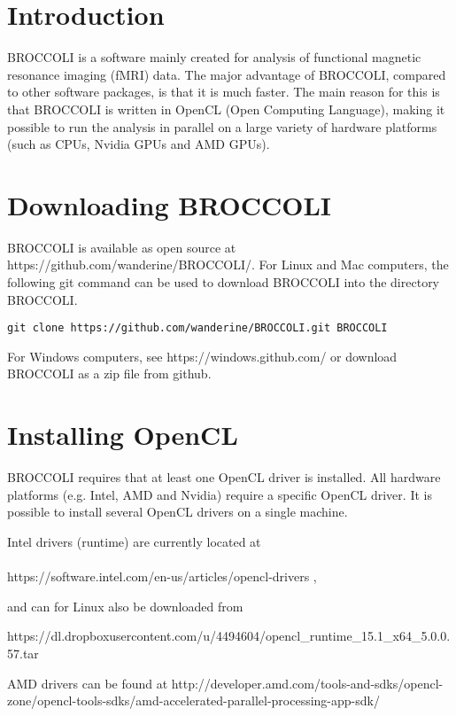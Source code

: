 \section{Introduction}

BROCCOLI is a software mainly created for analysis of functional magnetic resonance imaging (fMRI) data. The major advantage of BROCCOLI, compared to other software packages, is that it is much faster. The main reason for this is that BROCCOLI is written in OpenCL (Open Computing Language), making it possible to run the analysis in parallel on a large variety of hardware platforms (such as CPUs, Nvidia GPUs and AMD GPUs). 

\section{Downloading BROCCOLI}

BROCCOLI is available as open source at https://github.com/wanderine/BROCCOLI/. For Linux and Mac computers, the following git command can be used to download BROCCOLI into the directory BROCCOLI. 

\begin{verbatim}
git clone https://github.com/wanderine/BROCCOLI.git BROCCOLI
\end{verbatim}

For Windows computers, see https://windows.github.com/ or download BROCCOLI as a zip file from github. 

\section{Installing OpenCL}

BROCCOLI requires that at least one OpenCL driver is installed. All hardware platforms (e.g. Intel, AMD and Nvidia) require a specific OpenCL driver. It is possible to install several OpenCL drivers on a single machine.

Intel drivers (runtime) are currently located at \\ \\ https://software.intel.com/en-us/articles/opencl-drivers , 

and can for Linux also be downloaded from

https://dl.dropboxusercontent.com/u/4494604/opencl\_runtime\_15.1\_x64\_5.0.0.57.tar

AMD drivers can be found at http://developer.amd.com/tools-and-sdks/opencl-zone/opencl-tools-sdks/amd-accelerated-parallel-processing-app-sdk/

